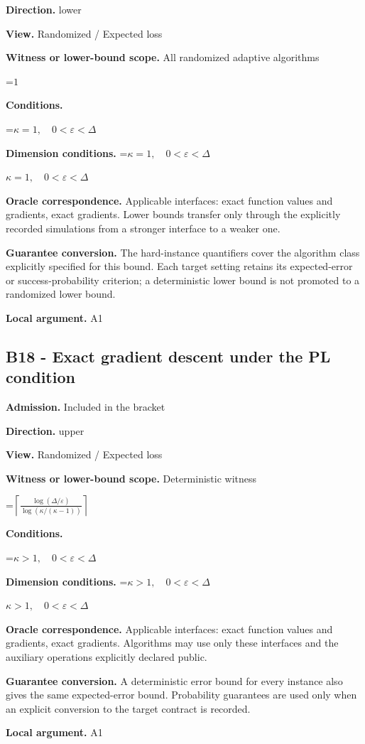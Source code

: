 \documentclass[10pt,a4paper]{article}
\newcommand{\AtlasMath}[1]{\par\begingroup\centering\setbox0=\hbox{$\displaystyle #1$}\ifdim\wd0>1.4\linewidth\typeout{ATLAS WIDE FORMULA: \the\wd0}\fi\ifdim\wd0>\linewidth\resizebox{\linewidth}{!}{\box0}\else\box0\fi\par\endgroup}
\newcommand{\AtlasInlineMath}[1]{\begingroup\setbox0=\hbox{$#1$}\ifdim\wd0>.4\linewidth\endgroup\AtlasMath{#1}\else\endgroup$#1$\fi}
\begin{document}
\textbf{Direction.} lower

\textbf{View.} Randomized / Expected loss

\textbf{Witness or lower-bound scope.} All randomized adaptive algorithms

\AtlasMath{1}
\textbf{Conditions.} 
\AtlasMath{\kappa=1,\quad0<\varepsilon<\Delta}


\textbf{Dimension conditions.} \AtlasInlineMath{\kappa=1,\quad0<\varepsilon<\Delta}

\textbf{Oracle correspondence.} Applicable interfaces: exact function values and gradients, exact gradients. Lower bounds transfer only through the explicitly recorded simulations from a stronger interface to a weaker one.

\textbf{Guarantee conversion.} The hard-instance quantifiers cover the algorithm class explicitly specified for this bound. Each target setting retains its expected-error or success-probability criterion; a deterministic lower bound is not promoted to a randomized lower bound.

\textbf{Local argument.} A1

\subsection{B18 - Exact gradient descent under the PL condition}
\textbf{Admission.} Included in the bracket

\textbf{Direction.} upper

\textbf{View.} Randomized / Expected loss

\textbf{Witness or lower-bound scope.} Deterministic witness

\AtlasMath{\left\lceil\frac{\log(\Delta/\varepsilon)}{\log(\kappa/(\kappa-1))}\right\rceil}
\textbf{Conditions.} 
\AtlasMath{\kappa>1,\quad0<\varepsilon<\Delta}


\textbf{Dimension conditions.} \AtlasInlineMath{\kappa>1,\quad0<\varepsilon<\Delta}

\textbf{Oracle correspondence.} Applicable interfaces: exact function values and gradients, exact gradients. Algorithms may use only these interfaces and the auxiliary operations explicitly declared public.

\textbf{Guarantee conversion.} A deterministic error bound for every instance also gives the same expected-error bound. Probability guarantees are used only when an explicit conversion to the target contract is recorded.

\textbf{Local argument.} A1
\end{document}
